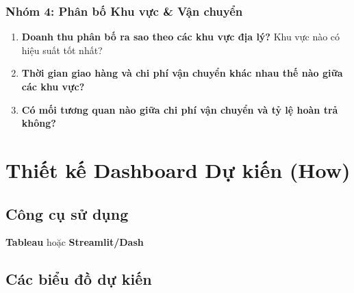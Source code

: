 \documentclass[12pt,a4paper]{article}
\begin{document}
\subsubsection{Nhóm 4: Phân bố Khu vực \& Vận chuyển}

\begin{enumerate}[leftmargin=1.5cm, start=10]
    \item \textbf{Doanh thu phân bố ra sao theo các khu vực địa lý?} Khu vực nào có hiệu suất tốt nhất?
    \item \textbf{Thời gian giao hàng và chi phí vận chuyển khác nhau thế nào giữa các khu vực?}
    \item \textbf{Có mối tương quan nào giữa chi phí vận chuyển và tỷ lệ hoàn trả không?}
\end{enumerate}

\section{Thiết kế Dashboard Dự kiến (How)}

\subsection{Công cụ sử dụng}

\textbf{Tableau} hoặc \textbf{Streamlit/Dash}

\subsection{Các biểu đồ dự kiến}
\end{document}
